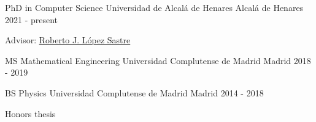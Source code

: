 

\begin{cventries}

  \cventry
    {PhD in Computer Science} %
    {Universidad de Alcalá de Henares} %
    {Alcalá de Henares} %
    {2021 - present} %
    {
      \begin{cvitems} %
        \item {Advisor: \href{https://gram.web.uah.es/people/rober/}{Roberto J. López Sastre}}
      \end{cvitems}
    }

  \cventry
    {MS Mathematical Engineering} %
    {Universidad Complutense de Madrid} %
    {Madrid} %
    {2018 - 2019} %
    {
      \begin{cvitems} %
      \end{cvitems}
    }

  \cventry
    {BS Physics} %
    {Universidad Complutense de Madrid} %
    {Madrid} %
    {2014 - 2018} %
    {
      \begin{cvitems} %
        \item {Honors thesis}
      \end{cvitems}
    }

\end{cventries}

